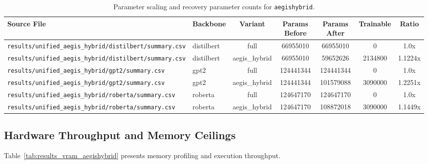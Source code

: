\begin{table}[t]
\centering
\small
\begin{tabular}{llccccc}
\toprule
\textbf{Source File} & \textbf{Backbone} & \textbf{Variant} & \textbf{Params Before} & \textbf{Params After} & \textbf{Trainable} & \textbf{Ratio} \\
\midrule
\texttt{results/unified\_aegis\_hybrid/distilbert/summary.csv} & distilbert & full & 66955010 & 66955010 & 0 & 1.0x \\
\texttt{results/unified\_aegis\_hybrid/distilbert/summary.csv} & distilbert & aegis\_hybrid & 66955010 & 59652626 & 2134800 & 1.1224x \\
\texttt{results/unified\_aegis\_hybrid/gpt2/summary.csv} & gpt2 & full & 124441344 & 124441344 & 0 & 1.0x \\
\texttt{results/unified\_aegis\_hybrid/gpt2/summary.csv} & gpt2 & aegis\_hybrid & 124441344 & 101579088 & 3090000 & 1.2251x \\
\texttt{results/unified\_aegis\_hybrid/roberta/summary.csv} & roberta & full & 124647170 & 124647170 & 0 & 1.0x \\
\texttt{results/unified\_aegis\_hybrid/roberta/summary.csv} & roberta & aegis\_hybrid & 124647170 & 108872018 & 3090000 & 1.1449x \\
\bottomrule
\end{tabular}
\caption{Parameter scaling and recovery parameter counts for \texttt{aegishybrid}.}
\label{tab:results_params_aegishybrid}
\end{table}

\subsection{Hardware Throughput and Memory Ceilings}
Table~\ref{tab:results_vram_aegishybrid} presents memory profiling and execution throughput.

